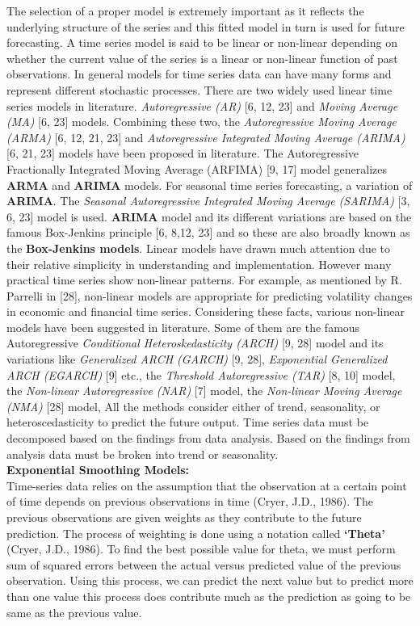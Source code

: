 \documentclass[10pt]{report}
\begin{document}
\begin{flushleft}
		The selection of a proper model is extremely important as it reflects the underlying structure of the series and this fitted model in turn is used for future forecasting. A time series model is said to be linear or non-linear depending on whether the current value of the series is a linear or non-linear function of past observations.  
		In general models for time series data can have many forms and represent different stochastic processes. There are two widely used linear time series models in literature. 
		\emph{Autoregressive (AR)} [6, 12, 23] and \emph{Moving Average (MA)} [6, 23] models. Combining these two, the \emph{Autoregressive Moving Average (ARMA)} [6, 12, 21, 23] and \emph{Autoregressive Integrated Moving Average (ARIMA)} [6, 21, 23] models have been proposed in literature. The Autoregressive Fractionally Integrated Moving Average (ARFIMA) [9, 17] model generalizes \textbf{ARMA} and \textbf{ARIMA} models. For seasonal time series forecasting, a variation of \textbf{ARIMA}. The \emph{Seasonal Autoregressive Integrated Moving Average (SARIMA)} [3, 6, 23] model is used. 
		\textbf{ARIMA} model and its different variations are based on the famous Box-Jenkins principle [6, 8,12, 23] and so these are also broadly known as the \textbf{Box-Jenkins models}.  
		Linear models have drawn much attention due to their relative simplicity in understanding and implementation. However many practical time series show non-linear patterns. For example, as mentioned by R. Parrelli in [28], non-linear models are appropriate for predicting volatility changes in economic and financial time series. Considering these facts, various non-linear models have been suggested in literature. Some of them are the famous Autoregressive 
		\emph{Conditional Heteroskedasticity (ARCH)} [9, 28] model and its variations like \emph{Generalized ARCH (GARCH)} [9, 28],\emph{ Exponential Generalized ARCH (EGARCH)} [9] etc., the \emph{Threshold Autoregressive (TAR)} [8, 10] model, the \emph{Non-linear Autoregressive (NAR)} [7] model, the \emph{Non-linear Moving Average (NMA)} [28] model, All the methods consider either of trend, seasonality, or heteroscedasticity to predict the future output. Time series data must be decomposed based on the findings from data analysis. Based on the findings from analysis data must be broken into trend or seasonality.
		\\
		\textbf{Exponential Smoothing Models:}\\
		Time-series data relies on the assumption that the observation at a certain point of time depends on previous observations in time (Cryer, J.D., 1986). The previous observations are given weights as they contribute to the future prediction. The process of weighting is done using a notation called \textbf{‘Theta’} (Cryer, J.D., 1986). To find the best possible value for theta, we must perform sum of squared errors between the actual versus predicted value of the previous observation. Using this process, we can predict the next value but to predict more than one value this process does contribute much as the prediction as going to be same as the previous value.\\

\end{flushleft}
\end{document}
